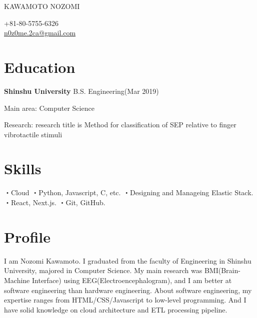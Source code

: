 \documentclass[10pt]{article} %
\begin{document}

\parbox[top][0.12\textheight][c]{\linewidth}{ %
	\vspace{-0.04\textheight} %
	{\color{name}\Huge KAWAMOTO NOZOMI}\\\medskip %
}

\begin{paracol}{2} %

{\faPhone} +81-80-5755-6326 \\ %
{\small\faEnvelope} \hspace{5mm} \href{mailto:n0z0me.2ca@gmail.com}{\small n0z0me.2ca@gmail.com} \\ %

\section{\Large Education}
\textbf{Shinshu University}
B.S. Engineering(Mar 2019)

Main area: Computer Science

Research: research title is Method for classification of SEP relative to finger vibrotactile stimuli

\section{\Large Skills}
・Cloud 
・Python, Javascript, C, etc.
・Designing and Manageing Elastic Stack.
・React, Next.js.
・Git, GitHub.

\switchcolumn %

\section{Profile}
I am Nozomi Kawamoto. I graduated from the faculty of Engineering in Shinshu University, majored in Computer Science. 
My main research was BMI(Brain-Machine Interface) using EEG(Electroencephalogram), and I am better at software engineering than hardware engineering.
About software engineering, my expertise ranges from HTML/CSS/Javascript to low-level programming. And I have solid knowledge on cloud architecture and ETL processing pipeline. 


\end{paracol}
\end{document}
